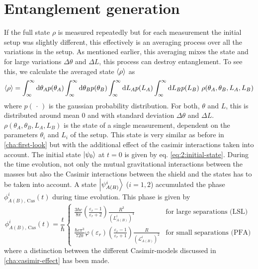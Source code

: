 \section{Entanglement generation}\label{sec:4:entanglement-generation}
If the full state $\rho$ is measured repeatedly but for each measurement the initial setup was slightly different, this effectively is an averaging process over all the variations in the setup.
As mentioned earlier, this averaging mixes the state and for large variations $\Delta \theta$ and $\Delta L$, this process can destroy entanglement.
To see this, we calculate the averaged state $\left\langle\rho\right\rangle$ as
\begin{equation}\label{eq:4:average-density}
  \left\langle\rho\right\rangle = \int_{\infty}^{\infty} \dd \theta_A p(\theta_A) \int_{\infty}^{\infty} \dd \theta_B p(\theta_B) \int_{\infty}^{\infty} \dd L_A p(L_A) \int_{\infty}^{\infty} \dd L_B p(L_B) \ \rho(\theta_A, \theta_B, L_A, L_B)
\end{equation} 
where $p(\,\cdot\,)$ is the gaussian probability distribution. For both, $\theta$ and $L$, this is distributed around mean $0$ and with standard deviation $\Delta \theta$ and $\Delta L$. $\rho(\theta_A, \theta_B, L_A, L_B)$ is the state of a single measurement, dependent on the parameters $\theta_i$ and $L_i$ of the setup.
This state is very similar as before in \cref{cha:first-look} but with the additional effect of the casimir interactions taken into account.
The initial state $\ket{\psi_0}$ at $t=0$ is given by eq. \eqref{eq:2:initial-state}.
During the time evolution, not only the mutual gravitational interactions between the masses but also the Casimir interactions between the shield and the states has to be taken into account. A state $\ket{\psi^i_{A(B)}}$ ($i = 1, 2$) accumulated the phase $\phi^i_{A(B),\,\mathrm{Cas}}(t)$ during time evolution.
This phase is given by
\begin{equation}
  \phi^i_{A(B),\,\mathrm{Cas}}(t) = \frac{t}{\hbar}
  \begin{cases}
     \frac{3 \hbar c}{8 \pi} \left(\frac{\varepsilon_r - 1}{\varepsilon_r + 2}\right) \frac{R^3}{(L^i_{A(B)})^4} & \text{for large separations (LSL)} \\
    \frac{\hbar c \pi^3}{720} \varphi(\varepsilon_r) \left(\frac{\varepsilon_r - 1}{\varepsilon_r + 1}\right) \frac{R}{(\mathscr{L}^i_{A(B)})^2} & \text{for small separations (PFA)}
  \end{cases}
\end{equation}
where a distinction between the different Casimir-models discussed in \cref{cha:casimir-effect} has been made.
